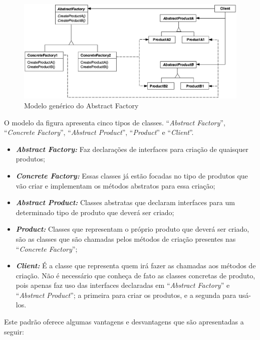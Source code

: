 \begin{apendicesenv}
\begin{figure}[!h]
	\centering
	\includegraphics[scale=0.5]{figuras/apendices/abstract_factory.eps}
	\caption[Modelo genérico do Abstract Factory]{Modelo genérico do Abstract Factory \cite{Gamma:1995}}
	\label{abstract_factory}
\end{figure}

O modelo da figura apresenta cinco tipos de classes. ``\textit{Abstract Factory}'', ``\textit{Concrete Factory}'', ``\textit{Abstract Product}'', ``\textit{Product}'' e ``\textit{Client}''.

\begin{itemize}
	\item \textbf{\textit{Abstract Factory:}} Faz declarações de interfaces para criação de quaisquer produtos;
	\item \textbf{\textit{Concrete Factory:}} Essas classes já estão focadas no tipo de produtos que vão criar e implementam os métodos abstratos para essa criação;
	\item \textbf{\textit{Abstract Product:}} Classes abstratas que declaram interfaces para um determinado tipo de produto que deverá ser criado;
	\item \textbf{\textit{Product:}} Classes que representam o próprio produto que deverá ser criado, são as classes que são chamadas pelos métodos de criação presentes nas ``\textit{Concrete Factory}'';
	\item \textbf{\textit{Client:}} É a classe que representa quem irá fazer as chamadas aos métodos de criação. Não é necessário que conheça de fato as classes concretas de produto, pois apenas faz uso das interfaces declaradas em ``\textit{Abstract Factory}'' e ``\textit{Abstract Product}''; a primeira para criar os produtos, e a segunda para usá-los.
\end{itemize}

Este padrão oferece algumas vantagens e desvantagens que são apresentadas a seguir:


\end{apendicesenv}
